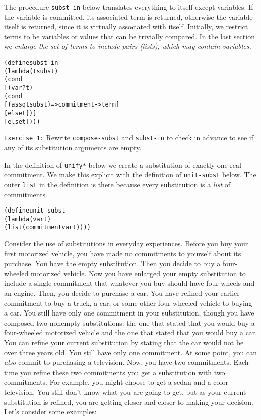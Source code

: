 The procedure \texttt{subst-in} below translates everything to
itself except variables.  If the variable is committed, its associated
term is returned, otherwise the variable itself is returned, since it
is virtually associated with itself. Initially, we restrict terms to
be variables or values that can be trivially compared.  In the last
section we \emph{enlarge the set of terms to include pairs (lists),
which may contain variables.}

\begin{alltt}
(define subst-in
  (lambda (t subst)
    (cond
      [(var? t)
       (cond
         [(assq t subst) => commitment->term]
         [else t])]
      [else t])))
\end{alltt}

\noindent
\texttt{Exercise 1:} Rewrite \texttt{compose-subst} and
\texttt{subst-in} to check in advance to see if any of
its substitution arguments are empty.\endofexercise

In the definition of \texttt{unify*} below we create a
substitution of exactly one real commitment. We make this explicit
with the definition of \texttt{unit-subst} below. The outer
\texttt{list} in the definition is there because every substitution is a
\emph{list} of commitments.

\begin{alltt}
(define unit-subst
  (lambda (var t)
    (list (commitment var t))))
\end{alltt}

Consider the use of substitutions in everyday experiences.  Before you
buy your first motorized vehicle, you have made no commitments to
yourself about its purchase.  You have the empty substitution.  Then
you decide to buy a four-wheeled motorized vehicle.  Now you have
enlarged your empty substitution to include a single commitment that
whatever you buy should have four wheels and an engine.  Then, you
decide to purchase a car.  You have refined your earlier commitment to
buy a truck, a car, or some other four-wheeled vehicle to buying a
car.  You still have only one commitment in your substitution, though
you have composed two nonempty substitutions: the one that stated that
you would buy a four-wheeled motorized vehicle and the one that stated
that you would buy a car.  You can refine your current substitution by
stating that the car would not be over three years old.  You still
have only one commitment.  At some point, you can \emph{also} commit
to purchasing a television.  Now, you have two commitments.  Each time
you refine these two commitments you get a substitution with two
commitments.  For example, you might choose to get a sedan and a color
television.  You still don't know what you are going to get, but as
your current substitution is refined, you are getting closer and
closer to making your decision.  Let's consider some examples:

